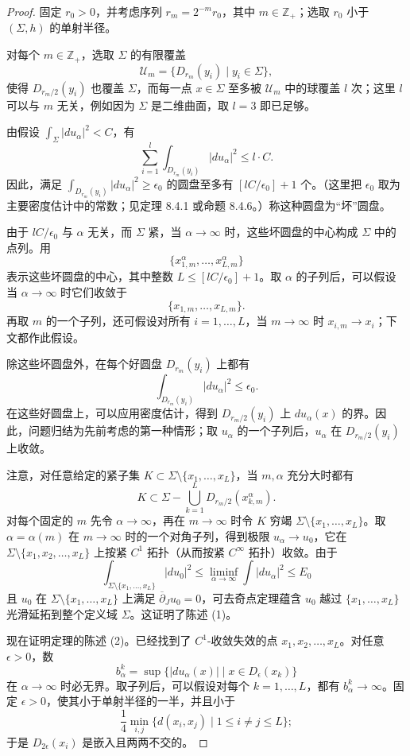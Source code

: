 \begin{proof}
固定 $r_0>0$，并考虑序列 $r_m=2^{-m}r_0$，其中
$m\in\mathbb Z_+$；选取 $r_0$ 小于 $(\Sigma,h)$ 的单射半径。

对每个 $m\in\mathbb Z_+$，选取 $\Sigma$ 的有限覆盖
\[
 \mathcal U_m=\{D_{r_m}(y_i)\mid y_i\in\Sigma\},
\]
使得 $D_{r_m/2}(y_i)$ 也覆盖 $\Sigma$，而每一点 $x\in\Sigma$ 至多被 $\mathcal U_m$ 中的球覆盖 $l$ 次；这里 $l$ 可以与 $m$ 无关，例如因为 $\Sigma$ 是二维曲面，取 $l=3$ 即已足够。

由假设 $\int_\Sigma|du_\alpha|^2<C$，有
\[
 \sum_{i=1}^l\int_{D_{r_m}(y_i)}|du_\alpha|^2\leq l\cdot C.
\]
因此，满足
$\int_{D_{r_m}(y_i)}|du_\alpha|^2\geq\epsilon_0$ 的圆盘至多有
$[lC/\epsilon_0]+1$ 个。（这里把 $\epsilon_0$ 取为主要密度估计中的常数；见定理 8.4.1 或命题 8.4.6。）称这种圆盘为“坏”圆盘。

由于 $lC/\epsilon_0$ 与 $\alpha$ 无关，而 $\Sigma$ 紧，当
$\alpha\to\infty$ 时，这些坏圆盘的中心构成 $\Sigma$ 中的点列。用
\[
 \{x_{1,m}^\alpha,\ldots,x_{L,m}^\alpha\}
\]
表示这些坏圆盘的中心，其中整数 $L\leq[lC/\epsilon_0]+1$。取 $\alpha$ 的子列后，可以假设当 $\alpha\to\infty$ 时它们收敛于
\[
 \{x_{1,m},\ldots,x_{L,m}\}.
\]
再取 $m$ 的一个子列，还可假设对所有 $i=1,\ldots,L$，当
$m\to\infty$ 时 $x_{i,m}\to x_i$；下文都作此假设。

除这些坏圆盘外，在每个好圆盘 $D_{r_m}(y_i)$ 上都有
\[
 \int_{D_{r_m}(y_i)}|du_\alpha|^2\leq\epsilon_0.
\]
在这些好圆盘上，可以应用密度估计，得到 $D_{r_m/2}(y_i)$ 上
$du_\alpha(x)$ 的界。因此，问题归结为先前考虑的第一种情形；取 $u_\alpha$ 的一个子列后，$u_\alpha$ 在 $D_{r_m/2}(y_i)$ 上收敛。

注意，对任意给定的紧子集
$K\subset\Sigma\setminus\{x_1,\ldots,x_L\}$，当 $m,\alpha$ 充分大时都有
\[
 K\subset\Sigma-\bigcup_{k=1}^LD_{r_m/2}(x_{k,m}^\alpha).
\]
对每个固定的 $m$ 先令 $\alpha\to\infty$，再在 $m\to\infty$ 时令 $K$ 穷竭
$\Sigma\setminus\{x_1,\ldots,x_L\}$。取 $\alpha=\alpha(m)$ 在
$m\to\infty$ 时的一个对角子列，得到极限
$u_\alpha\to u_0$，它在
$\Sigma\setminus\{x_1,x_2,\ldots,x_L\}$ 上按紧 $C^1$ 拓扑（从而按紧 $C^\infty$ 拓扑）收敛。由于
\[
 \int_{\Sigma\setminus\{x_1,\ldots,x_L\}}|du_0|^2
 \leq\liminf_{\alpha\to\infty}\int|du_\alpha|^2\leq E_0
\]
且 $u_0$ 在 $\Sigma\setminus\{x_1,\ldots,x_L\}$ 上满足
$\overline\partial_Ju_0=0$，可去奇点定理蕴含 $u_0$ 越过
$\{x_1,\ldots,x_L\}$ 光滑延拓到整个定义域 $\Sigma$。这证明了陈述 (1)。

现在证明定理的陈述 (2)。已经找到了 $C^1$-收敛失效的点
$x_1,x_2,\ldots,x_L$。对任意 $\epsilon>0$，数
\[
 b_\alpha^k=\sup\{|du_\alpha(x)|\mid x\in D_\epsilon(x_k)\}
\]
在 $\alpha\to\infty$ 时必无界。取子列后，可以假设对每个
$k=1,\ldots,L$，都有 $b_\alpha^k\to\infty$。固定 $\epsilon>0$，使其小于单射半径的一半，并且小于
\[
 \frac14\min_{i,j}\{d(x_i,x_j)\mid1\leq i\ne j\leq L\};
\]
于是 $D_{2\epsilon}(x_i)$ 是嵌入且两两不交的。


\end{proof}
